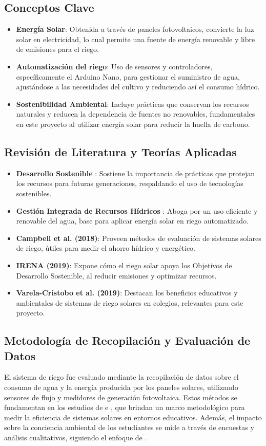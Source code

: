 \documentclass[12pt]{article}
\begin{document}
\subsection{Conceptos Clave}
\begin{itemize}
      \item \textbf{Energía Solar}: Obtenida a través de paneles fotovoltaicos, convierte la luz solar en electricidad, lo cual permite una fuente de energía renovable y libre de emisiones para el riego.
      \item \textbf{Automatización del riego}: Uso de sensores y controladores, específicamente el Arduino Nano, para gestionar el suministro de agua, ajustándose a las necesidades del cultivo y reduciendo así el consumo hídrico.
      \item \textbf{Sostenibilidad Ambiental}: Incluye prácticas que conservan los recursos naturales y reducen la dependencia de fuentes no renovables, fundamentales en este proyecto al utilizar energía solar para reducir la huella de carbono.
\end{itemize}

\subsection{Revisión de Literatura y Teorías Aplicadas}
\begin{itemize}
      \item \textbf{Desarrollo Sostenible} \cite{Brundtland1987}: Sostiene la importancia de prácticas que protejan los recursos para futuras generaciones, respaldando el uso de tecnologías sostenibles.
      \item \textbf{Gestión Integrada de Recursos Hídricos} \cite{GWP2000}: Aboga por un uso eficiente y renovable del agua, base para aplicar energía solar en riego automatizado.
      \item \textbf{Campbell et al. (2018)}: Proveen métodos de evaluación de sistemas solares de riego, útiles para medir el ahorro hídrico y energético.
      \item \textbf{IRENA (2019)}: Expone cómo el riego solar apoya los Objetivos de Desarrollo Sostenible, al reducir emisiones y optimizar recursos.
      \item \textbf{Varela-Cristobo et al. (2019)}: Destacan los beneficios educativos y ambientales de sistemas de riego solares en colegios, relevantes para este proyecto.
\end{itemize}

\subsection{Metodología de Recopilación y Evaluación de Datos}
El sistema de riego fue evaluado mediante la recopilación de datos sobre el consumo de agua y la energía producida por los paneles solares, utilizando sensores de flujo y medidores de generación fotovoltaica. Estos métodos se fundamentan en los estudios de \cite{Campbell2018} e \cite{IRENA2019}, que brindan un marco metodológico para medir la eficiencia de sistemas solares en entornos educativos. Además, el impacto sobre la conciencia ambiental de los estudiantes se mide a través de encuestas y análisis cualitativos, siguiendo el enfoque de \cite{Varela2019}.
\end{document}
